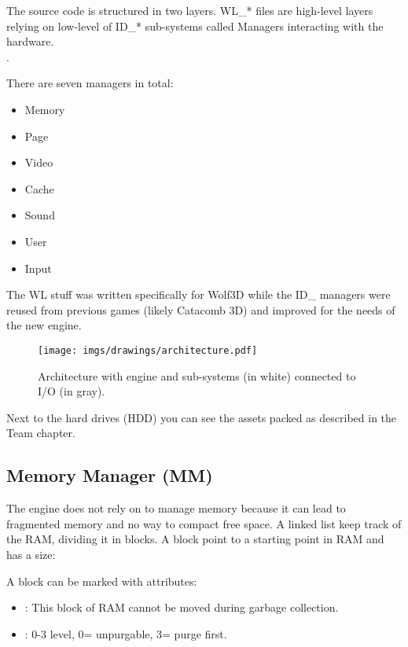 \documentclass[book.tex]{subfiles}
\begin{document}
The source code is structured in two layers. WL\_* files are high-level layers relying on low-level of ID\_* sub-systems called Managers interacting with the hardware.\\
.\\
\par
There are seven managers in total:\\
\begin{itemize}
	\item Memory
	\item Page
	\item Video
	\item Cache
	\item Sound
	\item User
	\item Input
\end{itemize}
The WL stuff was written specifically for Wolf3D while the ID\_ managers were reused from previous games (likely Catacomb 3D) and improved for the needs of the new engine.

\begin{figure}[H]
\centering
\texttt{[image: imgs/drawings/architecture.pdf]}
\caption{Architecture with engine and sub-systems (in white) connected to I/O (in gray).}
\label{fig:architecture}
\end{figure}
Next to the hard drives (HDD) you can see the assets packed as described in the Team chapter.










\subsection{Memory Manager (MM)}
The engine does not rely on  to manage memory because it can lead to fragmented memory and no way to compact free space. A linked list keep track of the RAM, dividing it in blocks. A block
point to a starting point in RAM and has a size:\\
 \par

 \par
A block can be marked with attributes:
\begin{itemize}
\item {} : This block of RAM cannot be moved during garbage collection.
\item {} : 0-3 level, 0= unpurgable, 3= purge first.
\end{itemize}
\end{document}
